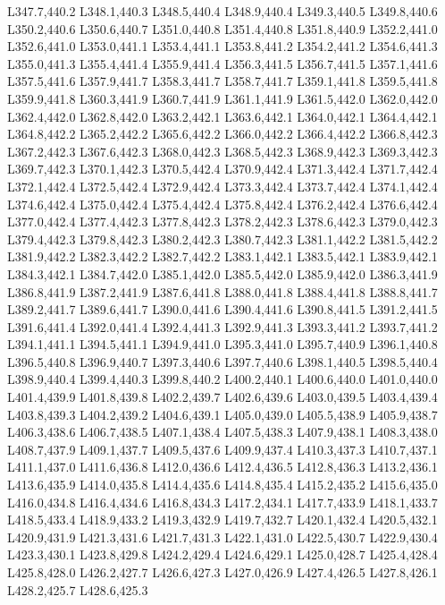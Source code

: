		L347.7,440.2 L348.1,440.3 L348.5,440.4 L348.9,440.4 L349.3,440.5 L349.8,440.6 L350.2,440.6 L350.6,440.7
		L351.0,440.8 L351.4,440.8 L351.8,440.9 L352.2,441.0 L352.6,441.0 L353.0,441.1 L353.4,441.1 L353.8,441.2
		L354.2,441.2 L354.6,441.3 L355.0,441.3 L355.4,441.4 L355.9,441.4 L356.3,441.5 L356.7,441.5 L357.1,441.6
		L357.5,441.6 L357.9,441.7 L358.3,441.7 L358.7,441.7 L359.1,441.8 L359.5,441.8 L359.9,441.8 L360.3,441.9
		L360.7,441.9 L361.1,441.9 L361.5,442.0 L362.0,442.0 L362.4,442.0 L362.8,442.0 L363.2,442.1 L363.6,442.1
		L364.0,442.1 L364.4,442.1 L364.8,442.2 L365.2,442.2 L365.6,442.2 L366.0,442.2 L366.4,442.2 L366.8,442.3
		L367.2,442.3 L367.6,442.3 L368.0,442.3 L368.5,442.3 L368.9,442.3 L369.3,442.3 L369.7,442.3 L370.1,442.3
		L370.5,442.4 L370.9,442.4 L371.3,442.4 L371.7,442.4 L372.1,442.4 L372.5,442.4 L372.9,442.4 L373.3,442.4
		L373.7,442.4 L374.1,442.4 L374.6,442.4 L375.0,442.4 L375.4,442.4 L375.8,442.4 L376.2,442.4 L376.6,442.4
		L377.0,442.4 L377.4,442.3 L377.8,442.3 L378.2,442.3 L378.6,442.3 L379.0,442.3 L379.4,442.3 L379.8,442.3
		L380.2,442.3 L380.7,442.3 L381.1,442.2 L381.5,442.2 L381.9,442.2 L382.3,442.2 L382.7,442.2 L383.1,442.1
		L383.5,442.1 L383.9,442.1 L384.3,442.1 L384.7,442.0 L385.1,442.0 L385.5,442.0 L385.9,442.0 L386.3,441.9
		L386.8,441.9 L387.2,441.9 L387.6,441.8 L388.0,441.8 L388.4,441.8 L388.8,441.7 L389.2,441.7 L389.6,441.7
		L390.0,441.6 L390.4,441.6 L390.8,441.5 L391.2,441.5 L391.6,441.4 L392.0,441.4 L392.4,441.3 L392.9,441.3
		L393.3,441.2 L393.7,441.2 L394.1,441.1 L394.5,441.1 L394.9,441.0 L395.3,441.0 L395.7,440.9 L396.1,440.8
		L396.5,440.8 L396.9,440.7 L397.3,440.6 L397.7,440.6 L398.1,440.5 L398.5,440.4 L398.9,440.4 L399.4,440.3
		L399.8,440.2 L400.2,440.1 L400.6,440.0 L401.0,440.0 L401.4,439.9 L401.8,439.8 L402.2,439.7 L402.6,439.6
		L403.0,439.5 L403.4,439.4 L403.8,439.3 L404.2,439.2 L404.6,439.1 L405.0,439.0 L405.5,438.9 L405.9,438.7
		L406.3,438.6 L406.7,438.5 L407.1,438.4 L407.5,438.3 L407.9,438.1 L408.3,438.0 L408.7,437.9 L409.1,437.7
		L409.5,437.6 L409.9,437.4 L410.3,437.3 L410.7,437.1 L411.1,437.0 L411.6,436.8 L412.0,436.6 L412.4,436.5
		L412.8,436.3 L413.2,436.1 L413.6,435.9 L414.0,435.8 L414.4,435.6 L414.8,435.4 L415.2,435.2 L415.6,435.0
		L416.0,434.8 L416.4,434.6 L416.8,434.3 L417.2,434.1 L417.7,433.9 L418.1,433.7 L418.5,433.4 L418.9,433.2
		L419.3,432.9 L419.7,432.7 L420.1,432.4 L420.5,432.1 L420.9,431.9 L421.3,431.6 L421.7,431.3 L422.1,431.0
		L422.5,430.7 L422.9,430.4 L423.3,430.1 L423.8,429.8 L424.2,429.4 L424.6,429.1 L425.0,428.7 L425.4,428.4
		L425.8,428.0 L426.2,427.7 L426.6,427.3 L427.0,426.9 L427.4,426.5 L427.8,426.1 L428.2,425.7 L428.6,425.3
